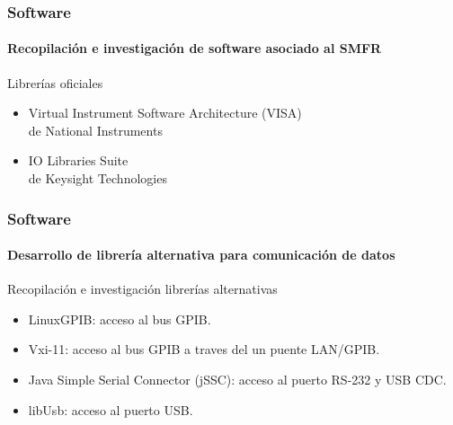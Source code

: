 \documentclass[xcolor=pdftext, table]{beamer}
\begin{document}
	\begin{frame}
		\frametitle{Software}
		\framesubtitle{Recopilación e investigación de software asociado al SMFR}
		
		\begin{block}{Librerías oficiales}
			\begin{itemize}
				\item Virtual Instrument Software Architecture (VISA) \\
				{\small de National Instruments}
				\item IO Libraries Suite \\
				{\small de Keysight Technologies}
			\end{itemize}
		\end{block}
	

	\end{frame}

	\begin{frame}
		\frametitle{Software}
		\framesubtitle{Desarrollo de librería alternativa para comunicación de datos}
		
		\begin{block}{Recopilación e investigación librerías alternativas}
			\begin{itemize}
				\item LinuxGPIB: acceso al bus GPIB.
				\item Vxi-11: acceso al bus GPIB a traves del un puente LAN/GPIB.
				\item Java Simple Serial Connector (jSSC): acceso al puerto RS-232 y USB CDC.
				\item libUsb: acceso al puerto USB.
			\end{itemize}
		\end{block}
		
	\end{frame}
\end{document}
